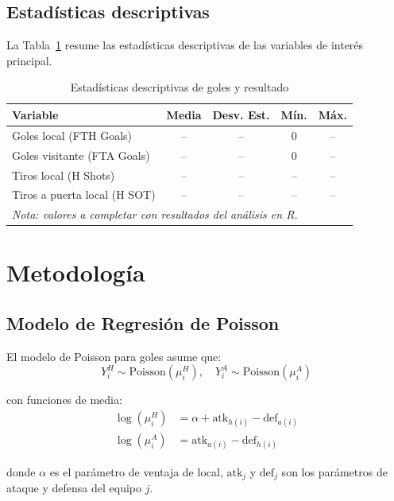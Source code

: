 \documentclass[a4paper,12pt]{article}
\begin{document}
\subsection{Estadísticas descriptivas}

La Tabla~\ref{tab:descriptiva} resume las estadísticas descriptivas de las variables de interés principal.

\begin{table}[h!]
\centering
\caption{Estadísticas descriptivas de goles y resultado}
\label{tab:descriptiva}
\begin{tabular}{lcccc}
\toprule
Variable & Media & Desv. Est. & Mín. & Máx. \\
\midrule
Goles local (FTH Goals) & -- & -- & 0 & -- \\
Goles visitante (FTA Goals) & -- & -- & 0 & -- \\
Tiros local (H Shots) & -- & -- & -- & -- \\
Tiros a puerta local (H SOT) & -- & -- & -- & -- \\
\midrule
\multicolumn{5}{l}{\textit{Nota: valores a completar con resultados del análisis en R.}} \\
\bottomrule
\end{tabular}
\end{table}

\section{Metodología}

\subsection{Modelo de Regresión de Poisson}

El modelo de Poisson para goles asume que:
\begin{equation}
Y_i^H \sim \text{Poisson}(\mu_i^H), \quad Y_i^A \sim \text{Poisson}(\mu_i^A)
\end{equation}

con funciones de media:
\begin{align}
\log(\mu_i^H) &= \alpha + \text{atk}_{h(i)} - \text{def}_{a(i)} \\
\log(\mu_i^A) &= \text{atk}_{a(i)} - \text{def}_{h(i)}
\end{align}

donde $\alpha$ es el parámetro de ventaja de local, $\text{atk}_j$ y $\text{def}_j$ son los parámetros de ataque y defensa del equipo $j$.
\end{document}
